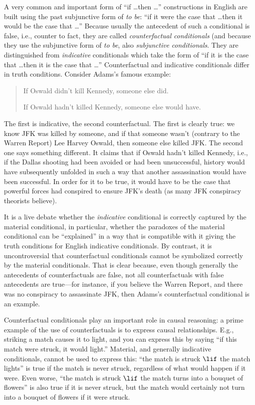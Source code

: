 \documentclass[../../../include/open-logic-section]{subfiles}
\begin{document}


A very common and important form of ``if \dots then \dots''
constructions in English are built using the past subjunctive form of
\emph{to be}: ``if it were the case that \dots then it would be the
case that \dots'' Because usually the antecedent of such a conditional
is false, i.e., counter to fact, they are called \emph{counterfactual
  conditionals} (and because they use the subjunctive form of \emph{to
  be}, also \emph{subjunctive conditionals}. They are distinguished
from \emph{indicative} conditionals which take the form of ``if it is
the case that \dots then it is the case that \dots'' Counterfactual and
indicative conditionals differ in truth conditions. Consider Adams's
famous example:
\begin{quote}
  If Oswald didn't kill Kennedy, someone else did.
  
  If Oswald hadn't killed Kennedy, someone else would have.
\end{quote}
The first is indicative, the second counterfactual. The first is
clearly true: we know JFK was killed by someone, and if that someone
wasn't (contrary to the Warren Report) Lee Harvey Oswald, then someone
else killed JFK. The second one says something different. It claims
that if Oswald hadn't killed Kennedy, i.e., if the Dallas shooting had
been avoided or had been unsuccessful, history would have subsequently
unfolded in such a way that another assassination would have been
successful. In order for it to be true, it would have to be the case
that powerful forces had conspired to ensure JFK's death (as many JFK
conspiracy theorists believe).

It is a live debate whether the \emph{indicative} conditional is
correctly captured by the material conditional, in particular, whether
the paradoxes of the material conditional can be ``explained'' in a
way that is compatible with it giving the truth conditions for English
indicative conditionals. By contrast, it is uncontroversial that
counterfactual conditionals cannot be symbolized correctly by the
material conditionals. That is clear because, even though generally
the antecedents of counterfactuals are false, not all counterfactuals
with false antecedents are true---for instance, if you believe the
Warren Report, and there was no conspiracy to assassinate JFK, then
Adams's counterfactual conditional is an example.

Counterfactual conditionals play an important role in causal
reasoning: a prime example of the use of counterfactuals is to express
causal relationships. E.g., striking a match causes it to light, and
you can express this by saying ``if this match were struck, it would
light.''  Material, and generally indicative conditionals, cannot be
used to express this: ``the match is struck $\lif$ the match lights''
is true if the match is never struck, regardless of what would happen
if it were. Even worse, ``the match is struck $\lif$ the match turns
into a bouquet of flowers'' is also true if it is never struck, but
the match would certainly not turn into a bouquet of flowers if it
were struck.
\end{document}
